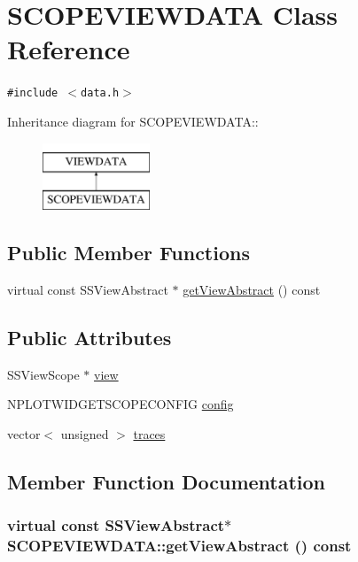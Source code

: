 \hypertarget{class_s_c_o_p_e_v_i_e_w_d_a_t_a}{
\section{SCOPEVIEWDATA Class Reference}
\label{class_s_c_o_p_e_v_i_e_w_d_a_t_a}
}
{\tt \#include $<$data.h$>$}

Inheritance diagram for SCOPEVIEWDATA::\begin{figure}[H]
\begin{center}
\leavevmode
\includegraphics[height=2cm]{class_s_c_o_p_e_v_i_e_w_d_a_t_a}
\end{center}
\end{figure}
\subsection*{Public Member Functions}
\begin{CompactItemize}
\item 
virtual const SSViewAbstract $\ast$ \hyperlink{class_s_c_o_p_e_v_i_e_w_d_a_t_a_8d8d73b107c571f756cd97d87809925d}{getViewAbstract} () const 
\end{CompactItemize}
\subsection*{Public Attributes}
\begin{CompactItemize}
\item 
SSViewScope $\ast$ \hyperlink{class_s_c_o_p_e_v_i_e_w_d_a_t_a_fb39fef6e2e245300dcdbe30374972dd}{view}
\item 
NPLOTWIDGETSCOPECONFIG \hyperlink{class_s_c_o_p_e_v_i_e_w_d_a_t_a_12a2f98e84e1c9df7d618279cb78487c}{config}
\item 
vector$<$ unsigned $>$ \hyperlink{class_s_c_o_p_e_v_i_e_w_d_a_t_a_96b9facdb199b5028186fdc2249c1053}{traces}
\end{CompactItemize}


\subsection{Member Function Documentation}
\hypertarget{class_s_c_o_p_e_v_i_e_w_d_a_t_a_8d8d73b107c571f756cd97d87809925d}{
\subsubsection[{getViewAbstract}]{\setlength{\rightskip}{0pt plus 5cm}virtual const SSViewAbstract$\ast$ SCOPEVIEWDATA::getViewAbstract () const}}
\label{class_s_c_o_p_e_v_i_e_w_d_a_t_a_8d8d73b107c571f756cd97d87809925d}




